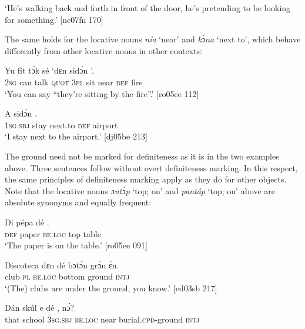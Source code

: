 \glt ‘He’s walking back and forth in front of the door, he’s pretending to be 
looking for something.’ [ne07fn 170]
\z

The same holds for the locative nouns \textit{nía} ‘near’ and \textit{kɔ́na} ‘next to’, which behave differently from other locative nouns in other contexts: 


\ea%
    \label{ex:key:923}
    \gll Yu  fít  tɔ́k  sé    ‘dɛn    sidɔ́n  ’.\\
\textsc{2sg}  can  talk  \textsc{quot}    \textsc{3pl}    sit    near    \textsc{def}   fire\\

\glt ‘You can say “they’re sitting by the fire”.’ [ro05ee 112]
\z


\ea%
    \label{ex:key:924}
    \gll A    sidɔ́n        .\\
\textsc{1sg.sbj}  stay    next.to    \textsc{def}  airport\\

\glt ‘I stay next to the airport.’ [dj05be 213]
\z

The ground need not be marked for definiteness as it is in the two examples above. Three sentences follow without overt definiteness marking. In this respect, the same principles of definiteness marking apply as they do for other objects. Note that the locative nouns \textit{ɔntɔ́p} ‘top; on’  and \textit{pantáp} ‘top; on’  above are absolute synonyms and equally frequent: 


\ea%
    \label{ex:key:925}
    \gll Di  pépa  dé      .\\
\textsc{def}  paper  \textsc{be.loc}  top    table\\

\glt ‘The paper is on the table.’ [ro05ee 091]
\z


\ea%
    \label{ex:key:926}
    \gll Discoteca  dɛn  dé    bɔtɔ́n  grɔ́n  ɛ́n.\\
club      \textsc{pl}  \textsc{be.loc}  bottom  ground  \textsc{intj}\\

\glt ‘(The) clubs are under the ground, you know.’ [ed03sb 217]
\z


\ea%
    \label{ex:key:927}
    \gll Dán  skúl    e    dé        ,    nɔ́?\\
that  school  \textsc{3sg.sbj}  \textsc{be.loc}  near    burial.\textsc{cpd}{}-ground  \textsc{intj}\\

